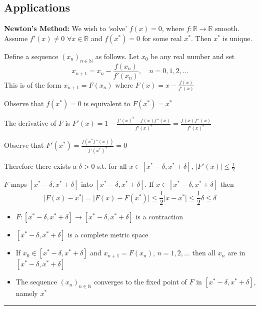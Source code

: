 \documentclass[landscape, 8pt]{extarticle}
\begin{document}
\begin{multicols}{3}
\section{Applications}

\textbf{Newton's Method:} We wish to `solve' $f(x) = 0$, where $f : \mathbb{R} \to \mathbb{R}$ smooth. Assume $f'(x) \ne 0$ $\forall x\in\mathbb{R}$ and $f(x^{*}) = 0$ for some real $x^{*}$. Then $x^{*}$ is unique.

Define a sequence $(x_{n})_{n\in \mathbb{N}}$ as follows. Let $x_{0}$ be any real number and set
\[x_{n+1} = x_{n} - \frac{f(x_{n})}{f'(x_{n})}, \quad n = 0,1,2,\dots\]
This is of the form $x_{n+1} = F(x_{n})$ where $\displaystyle F(x) = x - \frac{f(x)}{f'(x)}$

Observe that $f(x^{*}) = 0$ is equivalent to $F(x^{*}) = x^{*}$

The derivative of $F$ is $\displaystyle F'(x) = 1 - \frac{f'(x)^{2} - f(x)f''(x)}{f'(x)^{2}} = \frac{f(x)f''(x)}{f'(x)^{2}}$

Observe that $F'(x^{*}) = \frac{f(x^{*} f''(x))}{f'(x^{*})^{2}} = 0$

Therefore there exists a $\delta >0$ s.t. for all $x\in [x^{*} - \delta, x^{*} + \delta],\,\lvert F'(x) \rvert \le \frac{1}{2}$ 

$F$ maps $[x^{*} - \delta, x^{*} + \delta]$ into $[x^{*} - \delta, x^{*} + \delta]$. If $x\in [x^{*} - \delta, x^{*} + \delta]$ then
\[\lvert F(x) - x^{*} \rvert = \lvert F(x) - F(x^{*}) \rvert \le \frac{1}{2} \lvert x - x^{*} \rvert \le \frac{1}{2}\delta \le \delta\]

\vspace{-8pt}
\begin{itemize}[leftmargin=*]
    \item $F : [x^{*} - \delta, x^{*} + \delta] \to [x^{*} - \delta, x^{*} + \delta]$ is a contraction
    \item $[x^{*} - \delta, x^{*} + \delta]$ is a complete metric space
    \item If $x_{0}\in [x^{*} - \delta, x^{*} + \delta]$ and $x_{n+1} = F(x_{n}),\, n=1,2,\dots$ then all $x_{n}$ are in $[x^{*} - \delta, x^{*} + \delta]$
    \item The sequence $(x_{n})_{n\in \mathbb{N}}$ converges to the fixed point of $F$ in $[x^{*} - \delta, x^{*} + \delta]$, namely $x^{*}$
\end{itemize}
\vspace{-12pt}
\noindent\rule{0.3\textwidth}{0.5pt}


\end{multicols}
\end{document}
